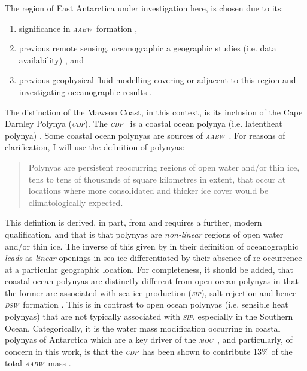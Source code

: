\documentclass[11pt,a4paper]{article}
\newcommand{\moc}{\textit{\textsc{moc}}} %
\newcommand{\sip}{\textit{\textsc{sip}}} %
\newcommand{\dsw}{\textit{\textsc{{dsw}}}} %
\newcommand{\aabw}{\textit{\textsc{{aabw}}}} %
\newcommand{\cdp}{\textit{\textsc{{cdp}}}} %
\begin{document}
The region of East Antarctica under investigation here, is chosen due to its:
\begin{enumerate}
\item significance in \aabw~formation
  \citep{Williams2010,Ohshima2016,Tamura2016,Williams2016,Fraser2019,Aoki2020},
\item previous remote sensing, oceanographic a geographic studies (i.e. data availability)
  \citep{Meijers2010,Williams2010,Ohshima2013,Tamura2016,Fraser2019,Aoki2020,Smith2020},
  and
\item previous geophysical fluid modelling covering or adjacent to this region
  and investigating oceanographic results
  \citep{Galton-Fenzi2012,Nakayama2014,Liu2017,Kusahara2017a,Kusahara2017b,Naughten2018,VanAchter2021}.
\end{enumerate}

The distinction of the Mawson Coast, in this context, is its inclusion of the Cape Darnley Polynya
(\cdp). The \cdp~\citep{Meijers2010,Ohshima2013} is a coastal ocean polynya
(i.e. latent\textendash heat polynya) \citep{Massom1999,Tamura2008}. Some coastal ocean
polynyas are sources of \aabw~\citep{Massom1999,Maqueda2004,Tamura2008}. For
reasons of clarification, I will use the \cite{Barber2007} definition of
polynyas:
\begin{quote}
  Polynyas are persistent reoccurring regions of open water and/or thin ice,
  tens to tens of thousands of square kilometres in extent, that occur at
  locations where more consolidated and thicker ice cover would be
  climatologically expected.
\end{quote}
This defintion is derived, in part, from \cite{Smith1990} and requires a
further, modern qualification, and that is that polynyas are \textit{non-linear}
regions \citep{Massom1999} of open water and/or thin ice. The inverse of this
given by \cite{Smith1990} in their definition of oceanographic \textit{leads} as
\textit{linear} openings in sea ice differentiated by their absence of
re-occurrence at a particular geographic location. For completeness, it should
be added, that coastal ocean polynyas are distinctly different from open ocean
polynyas in that the former are associated with sea ice production (\sip),
salt-rejection and hence \dsw~formation
\citep{Massom1999,Maqueda2004,Tamura2008}. This is in contrast to open ocean
polynyas (i.e. sensible heat polynyas) that are not typically associated with
\sip, especially in the Southern Ocean. Categorically, it is the water mass
modification occurring in coastal polynyas of Antarctica which are a key driver of the \moc~\citep{Gawarkiewicz1995,Orsi1999,Galton-Fenzi2012,Sansiviero2017},
and particularly, of concern in this work, is that the \cdp~has been shown to
contribute 13\% of the total \aabw~mass \citep{Ohshima2013}.
\end{document}
